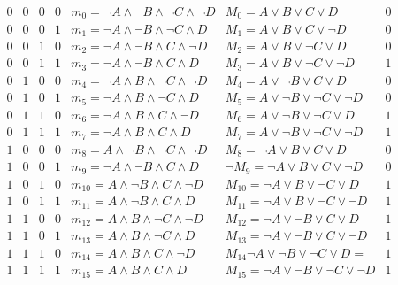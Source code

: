 \documentclass[11pt]{article}
\begin{document}
\begin{displaymath}
\begin{array}{cccc|c|c|c}
0 & 0 & 0 & 0 & m_0 =   \lnot A \land \lnot B \land\lnot C \land\lnot D & M_0 =  A \lor  B \lor C \lor  D & 0 \\
0 & 0 & 0 & 1 & m_1 =  \lnot A \land \lnot B \land\lnot C \land D& M_1 = A \lor  B \lor C \lor \lnot D & 0 \\
0 & 0 & 1 & 0 & m_2 = \lnot A \land \lnot B \land C \land\lnot D & M_2 = A \lor  B \lor\lnot C \lor  D  & 0 \\
0 & 0 & 1 & 1 & m_3 =\lnot A \land \lnot B \land C \land D  & M_3 =  A \lor  B \lor\lnot C \lor \lnot D & 1 \\
0 & 1 & 0 & 0 & m_4 =\lnot A \land  B \land\lnot C \land\lnot D  & M_4 =  A \lor \lnot B \lor C \lor  D & 0 \\
0 & 1 & 0 & 1 & m_5 =  \lnot A \land  B \land\lnot C \land D& M_5 =  A \lor \lnot B \lor\lnot C \lor \lnot D & 0 \\
0 & 1 & 1 & 0 & m_6 =  \lnot A \land  B \land  C \land\lnot D& M_6 =  A \lor \lnot B \lor\lnot C \lor  D & 1 \\
0 & 1 & 1 & 1 & m_7 =  \lnot A \land  B \land  C \land  D& M_7 = A \lor \lnot B \lor\lnot C \lor \lnot D  & 1 \\
1 & 0 & 0 & 0 & m_8 =   A \land \lnot B \land\lnot C \land\lnot D& M_8 = \lnot A \lor  B \lor C \lor  D & 0 \\
1 & 0 & 0 & 1 & m_9 = \lnot A \land \lnot B \land C \land D & \lnot M_9 =  \lnot A \lor  B \lor C \lor \lnot D& 0 \\
1 & 0 & 1 & 0 & m_{10} = A \land  \lnot B \land C \land \lnot D  & M_{10} = \lnot A \lor  B \lor\lnot C \lor  D  & 1 \\
1 & 0 & 1 & 1 & m_{11} =  A \land \lnot B \land C \land D & M_{11} = \lnot A \lor  B \lor\lnot C \lor \lnot D & 1 \\
1 & 1 & 0 & 0 & m_{12} =  A \land  B \land\lnot C \land\lnot D & M_{12} =  \lnot A \lor \lnot B \lor C \lor  D & 1 \\
1 & 1 & 0 & 1 & m_{13} =  A \land  B \land\lnot C \land D & M_{13} = \lnot A \lor \lnot B \lor C \lor \lnot D & 1 \\
1 & 1 & 1 & 0 & m_{14} =  A \land  B \land C \land\lnot D & M_{14} \lnot A \lor \lnot B \lor\lnot C \lor  D= & 1 \\
1 & 1 & 1 & 1 & m_{15} =  A \land  B \land C \land D& M_{15} =  \lnot A \lor \lnot B \lor\lnot C \lor \lnot D & 1
\end{array}
\end{displaymath}
\end{document}
